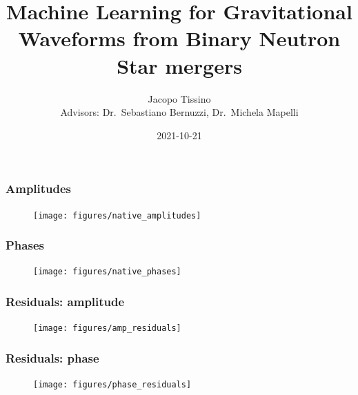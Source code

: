 \documentclass{beamer}
\title{Machine Learning for Gravitational Waveforms from Binary Neutron Star mergers}
\author{Jacopo Tissino \\ Advisors: Dr.\ Sebastiano Bernuzzi, Dr.\ Michela Mapelli}
\date{2021-10-21}
\begin{document}
\frame{\titlepage}

\begin{frame}
    \frametitle{Amplitudes}
    \begin{figure}[ht]
    \centering
    \texttt{[image: figures/native\_amplitudes]}
    \label{fig:native_amplitudes}
    \end{figure}
\end{frame}

\begin{frame}
    \frametitle{Phases}
    \begin{figure}[ht]
    \centering
    \texttt{[image: figures/native\_phases]}
    \label{fig:native_phases}
    \end{figure}
\end{frame}


\begin{frame}
    \frametitle{Residuals: amplitude}
    \begin{figure}[ht]
    \centering
    \texttt{[image: figures/amp\_residuals]}
    \label{fig:amp_residuals}
    \end{figure}
\end{frame}

\begin{frame}
    \frametitle{Residuals: phase}
    \begin{figure}[ht]
    \centering
    \texttt{[image: figures/phase\_residuals]}
    \label{fig:phase_residuals}
    \end{figure}
\end{frame}
\end{document}
